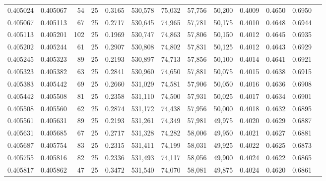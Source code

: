 \begin{tabular}{rrrrrrrrrrrrr}
0.405024 & 0.405067 &    54 &  25 &                                     0.3165 & 530,578 &  75,032 &  57,756 &  50,200 & 0.4009 & 0.4650 & 0.6950 \\
0.405067 & 0.405113 &    67 &  25 &                                     0.2717 & 530,645 &  74,965 &  57,781 &  50,175 & 0.4010 & 0.4648 & 0.6944 \\
0.405113 & 0.405201 &   102 &  25 &                                     0.1969 & 530,747 &  74,863 &  57,806 &  50,150 & 0.4012 & 0.4645 & 0.6935 \\
0.405202 & 0.405244 &    61 &  25 &                                     0.2907 & 530,808 &  74,802 &  57,831 &  50,125 & 0.4012 & 0.4643 & 0.6929 \\
0.405245 & 0.405323 &    89 &  25 &                                     0.2193 & 530,897 &  74,713 &  57,856 &  50,100 & 0.4014 & 0.4641 & 0.6921 \\
0.405323 & 0.405382 &    63 &  25 &                                     0.2841 & 530,960 &  74,650 &  57,881 &  50,075 & 0.4015 & 0.4638 & 0.6915 \\
0.405383 & 0.405442 &    69 &  25 &                                     0.2660 & 531,029 &  74,581 &  57,906 &  50,050 & 0.4016 & 0.4636 & 0.6908 \\
0.405442 & 0.405508 &    81 &  25 &                                     0.2358 & 531,110 &  74,500 &  57,931 &  50,025 & 0.4017 & 0.4634 & 0.6901 \\
0.405508 & 0.405560 &    62 &  25 &                                     0.2874 & 531,172 &  74,438 &  57,956 &  50,000 & 0.4018 & 0.4632 & 0.6895 \\
0.405561 & 0.405631 &    89 &  25 &                                     0.2193 & 531,261 &  74,349 &  57,981 &  49,975 & 0.4020 & 0.4629 & 0.6887 \\
0.405631 & 0.405685 &    67 &  25 &                                     0.2717 & 531,328 &  74,282 &  58,006 &  49,950 & 0.4021 & 0.4627 & 0.6881 \\
0.405687 & 0.405754 &    83 &  25 &                                     0.2315 & 531,411 &  74,199 &  58,031 &  49,925 & 0.4022 & 0.4625 & 0.6873 \\
0.405755 & 0.405816 &    82 &  25 &                                     0.2336 & 531,493 &  74,117 &  58,056 &  49,900 & 0.4024 & 0.4622 & 0.6865 \\
0.405817 & 0.405862 &    47 &  25 &                                     0.3472 & 531,540 &  74,070 &  58,081 &  49,875 & 0.4024 & 0.4620 & 0.6861 \\

\end{tabular}
